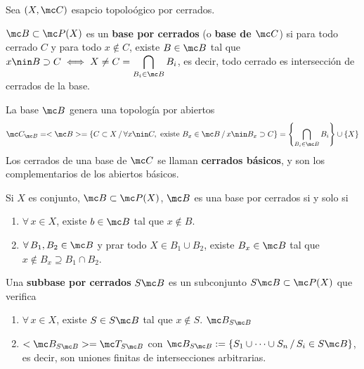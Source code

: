 Sea $(X,\mc C)$ esapcio topolo\'ogico por cerrados. \begin{defi}
    $\mc B \subset \mc P(X)$ es un \textbf{base por cerrados} (o \textbf{base de $\mc C$}) si para todo cerrado $C$ y para todo $x\nin C$, existe $B \in \mc B$ tal que $x\nin B \supset C \iff X \neq C =\displaystyle \bigcap_{B_i \in \mc B} B_i$, es decir, todo cerrado es intersecci\'on de cerrados de la base. 
\end{defi}
\begin{defi} La base $\mc B$ genera una topolog\'ia por abiertos 
    $$\mc C_{\mc B} = <\mc B> = \{C \subset X \, / \, \forall x \nin C, \text{ existe } B_x \in \mc B \, / \, x \nin B_x \supset C\}  =\left\{\bigcap_{B_i \in \mc B} B_i \right\}\cup \{X\}$$
    Los cerrados de una base de $\mc C$ se llaman \textbf{cerrados básicos}, y son los complementarios de los abiertos b\'asicos.

\end{defi}
\begin{prop}
Si $X$ es conjunto, $\mc B \subset \mc P(X)$, $\mc B$ es una base por cerrados si y solo si
\begin{enumerate}
    \item $\forall\, x\in X$, existe $b\in \mc B$ tal que $x\nin B$.
    \item $\forall \, B_1,B_2 \in \mc B$ y prar todo $X\in B_1\cup B_2$, existe $B_x\in \mc B$ tal que $x \nin B_x \supseteq B_1\cap B_2$.
\end{enumerate}
\end{prop}
\begin{defi}
    Una \textbf{subbase por cerrados} $S\mc B$ es un subconjunto $S\mc B\subset \mc P(X)$ que verifica 
    \begin{enumerate}
        \item $\forall \, x\in X$, existe $S\in S\mc B$ tal que $x\nin S$. $\mc B_{S\mc B}$
        \item $<\mc B_{S\mc B}> = \mc T_{S\mc B}$ con $\mc B_{S\mc B} := \{S_1\cup \cdots \cup S_n \, / \,S_i\in S\mc B \}$, es decir, son uniones finitas de intersecciones arbitrarias. 
    \end{enumerate}
\end{defi}

